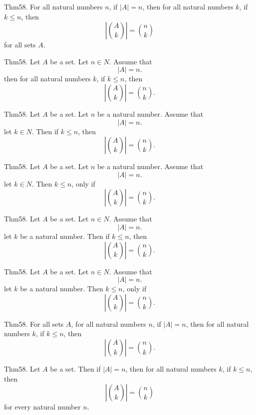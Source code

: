 \documentclass{article}
\begin{document}
Thm58. For all natural numbers $n$, if $| A | = n$, then for all natural numbers $k$, if $k \leq n$, then $$| \binom{ A }{ k}| = \binom{ n }{ k}$$ for all sets $A$.

Thm58. Let $A$ be a set. Let $n \in N$. Assume that $$| A | = n.$$ then for all natural numbers $k$, if $k \leq n$, then $$| \binom{ A }{ k}| = \binom{ n }{ k}.$$

Thm58. Let $A$ be a set. Let $n$ be a natural number. Assume that $$| A | = n.$$ let $k \in N$. Then if $k \leq n$, then $$| \binom{ A }{ k}| = \binom{ n }{ k}.$$

Thm58. Let $A$ be a set. Let $n$ be a natural number. Assume that $$| A | = n.$$ let $k \in N$. Then $k \leq n$, only if $$| \binom{ A }{ k}| = \binom{ n }{ k}.$$

Thm58. Let $A$ be a set. Let $n \in N$. Assume that $$| A | = n.$$ let $k$ be a natural number. Then if $k \leq n$, then $$| \binom{ A }{ k}| = \binom{ n }{ k}.$$

Thm58. Let $A$ be a set. Let $n \in N$. Assume that $$| A | = n.$$ let $k$ be a natural number. Then $k \leq n$, only if $$| \binom{ A }{ k}| = \binom{ n }{ k}.$$

Thm58. For all sets $A$, for all natural numbers $n$, if $| A | = n$, then for all natural numbers $k$, if $k \leq n$, then $$| \binom{ A }{ k}| = \binom{ n }{ k}.$$

Thm58. Let $A$ be a set. Then if $| A | = n$, then for all natural numbers $k$, if $k \leq n$, then $$| \binom{ A }{ k}| = \binom{ n }{ k}$$ for every natural number $n$.
\end{document}

